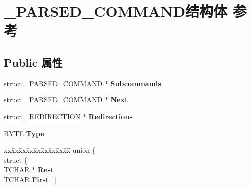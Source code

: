 \hypertarget{struct___p_a_r_s_e_d___c_o_m_m_a_n_d}{}\section{\+\_\+\+P\+A\+R\+S\+E\+D\+\_\+\+C\+O\+M\+M\+A\+N\+D结构体 参考}
\label{struct___p_a_r_s_e_d___c_o_m_m_a_n_d}
\subsection*{Public 属性}
\begin{DoxyCompactItemize}
\item 
\mbox{\label{struct___p_a_r_s_e_d___c_o_m_m_a_n_d_ab9a8bd9669022d0c8f81d02880892c5c}} 
\hyperlink{interfacestruct}{struct} \hyperlink{struct___p_a_r_s_e_d___c_o_m_m_a_n_d}{\+\_\+\+P\+A\+R\+S\+E\+D\+\_\+\+C\+O\+M\+M\+A\+ND} $\ast$ {\bfseries Subcommands}
\item 
\mbox{\label{struct___p_a_r_s_e_d___c_o_m_m_a_n_d_afc9d31de657801e9a4f359cb36b24e1e}} 
\hyperlink{interfacestruct}{struct} \hyperlink{struct___p_a_r_s_e_d___c_o_m_m_a_n_d}{\+\_\+\+P\+A\+R\+S\+E\+D\+\_\+\+C\+O\+M\+M\+A\+ND} $\ast$ {\bfseries Next}
\item 
\mbox{\label{struct___p_a_r_s_e_d___c_o_m_m_a_n_d_ad8a80bc808b65a975fd57a327e807b22}} 
\hyperlink{interfacestruct}{struct} \hyperlink{struct___r_e_d_i_r_e_c_t_i_o_n}{\+\_\+\+R\+E\+D\+I\+R\+E\+C\+T\+I\+ON} $\ast$ {\bfseries Redirections}
\item 
\mbox{\label{struct___p_a_r_s_e_d___c_o_m_m_a_n_d_a31023f559ddb93c242345cf42cfe4a50}} 
B\+Y\+TE {\bfseries Type}
\item 
\mbox{\label{struct___p_a_r_s_e_d___c_o_m_m_a_n_d_a2f372830f4a459627752f5f6b78c579d}} 
\begin{tabbing}
xx\=xx\=xx\=xx\=xx\=xx\=xx\=xx\=xx\=\kill
union \{\\
\>struct \{\\
\>\>TCHAR $\ast$ {\bfseries Rest}\\
\>\>TCHAR {\bfseries First} \mbox{[}$\,$\mbox{]}\\

\end{tabbing}
\end{DoxyCompactItemize}
